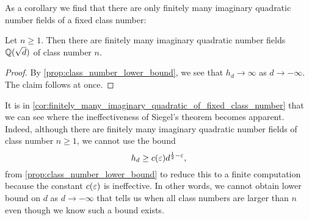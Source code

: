     As a corollary we find that there are only finitely many imaginary quadratic number fields of a fixed class number:

    \begin{corollary}\label{cor:finitely_many_imaginary_quadratic_of_fixed_class_number}
      Let $n \ge 1$. Then there are finitely many imaginary quadratic number fields $\mathbb{Q}(\sqrt{d})$ of class number $n$.
    \end{corollary}
    \begin{proof}
      By \cref{prop:class_number_lower_bound}, we see that $h_{d} \to \infty$ as $d \to -\infty$. The claim follows at once.
    \end{proof}

    It is in \cref{cor:finitely_many_imaginary_quadratic_of_fixed_class_number} that we can see where the ineffectiveness of Siegel's theorem becomes apparent. Indeed, although there are finitely many imaginary quadratic number fields of class number $n \ge 1$, we cannot use the bound
    \[
      h_{d} \ge c(\varepsilon)d^{\frac{1}{2}-\varepsilon},
    \]
    from \cref{prop:class_number_lower_bound} to reduce this to a finite computation because the constant $c(\varepsilon)$ is ineffective. In other words, we cannot obtain lower bound on $d$ as $d \to -\infty$ that tells us when all class numbers are larger than $n$ even though we know such a bound exists.